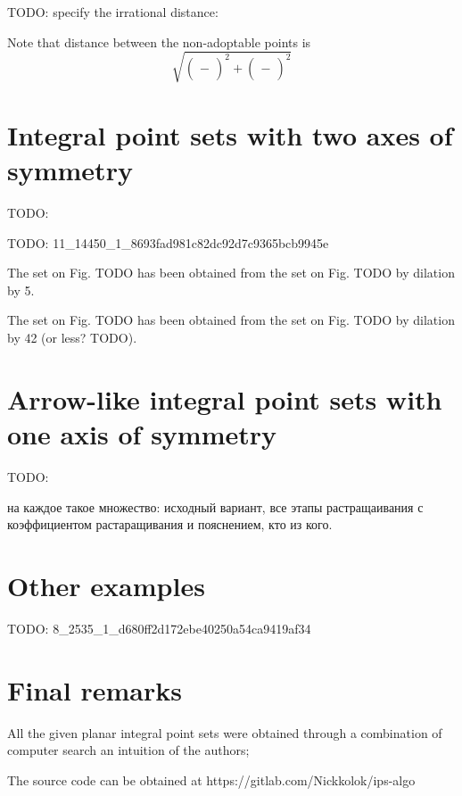 \documentclass[12pt]{article}
\theoremstyle{theorem}
\theoremstyle{dfn}
\theoremstyle{remark}
\begin{document}
TODO: specify the irrational distance:

Note that distance between the non-adoptable points is
\begin{equation}
	\sqrt{\left(\frac{}{} - \frac{}{}\right)^2 + \left(\frac{}{} - \frac{}{}\right)^2}
\end{equation}

\section{Integral point sets with two axes of symmetry}

TODO:

TODO: 11\_14450\_1\_8693fad981c82dc92d7c9365bcb9945e

The set on Fig. TODO has been obtained from the set on Fig. TODO by dilation by 5.

The set on Fig. TODO has been obtained from the set on Fig. TODO by dilation by 42 (or less? TODO).

\section{Arrow-like integral point sets with one axis of symmetry}

TODO:

на каждое такое множество: исходный вариант, все этапы растращаивания с коэффициентом растаращивания и пояснением, кто из кого.


\section{Other examples}

TODO: 8\_2535\_1\_d680ff2d172ebe40250a54ca9419af34


\section{Final remarks}
All the given planar integral point sets were obtained through a combination of computer search an intuition of the authors;

The source code can be obtained at https://gitlab.com/Nickkolok/ips-algo

\printbibliography
\end{document}
